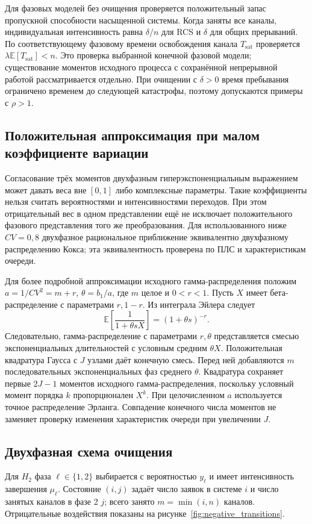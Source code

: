 Для фазовых моделей без очищения проверяется положительный запас пропускной способности насыщенной системы. Когда заняты все каналы, индивидуальная интенсивность равна \(\delta/n\) для RCS и \(\delta\) для общих прерываний. По соответствующему фазовому времени освобождения канала \(T_{\mathrm{sat}}\) проверяется \(\lambda\mathbb E[T_{\mathrm{sat}}]<n\). Это проверка выбранной конечной фазовой модели; существование моментов исходного процесса с сохранённой непрерывной работой рассматривается отдельно. При очищении с \(\delta>0\) время пребывания ограничено временем до следующей катастрофы, поэтому допускаются примеры с \(\rho>1\).

\subsection{Положительная аппроксимация при малом коэффициенте вариации}
Согласование трёх моментов двухфазным гиперэкспоненциальным выражением может давать веса вне \([0,1]\) либо комплексные параметры. Такие коэффициенты нельзя считать вероятностями и интенсивностями переходов. При этом отрицательный вес в одном представлении ещё не исключает положительного фазового представления того же преобразования. Для использованного ниже \(CV=0{,}8\) двухфазное рациональное приближение эквивалентно двухфазному распределению Кокса; эта эквивалентность проверена по ПЛС и характеристикам очереди.

Для более подробной аппроксимации исходного гамма-распределения положим \(a=1/CV^2=m+r\), \(\theta=b_1/a\), где \(m\) целое и \(0<r<1\). Пусть \(X\) имеет бета-распределение с параметрами \(r,1-r\). Из интеграла Эйлера \cite{nistdlmf} следует
\[
\mathbb E\!\left[\frac{1}{1+\theta sX}\right]=(1+\theta s)^{-r}.
\]
Следовательно, гамма-распределение с параметрами \(r,\theta\) представляется смесью экспоненциальных длительностей с условным средним \(\theta X\). Положительная квадратура Гаусса с \(J\) узлами даёт конечную смесь. Перед ней добавляются \(m\) последовательных экспоненциальных фаз среднего \(\theta\). Квадратура сохраняет первые \(2J-1\) моментов исходного гамма-распределения, поскольку условный момент порядка \(k\) пропорционален \(X^k\). При целочисленном \(a\) используется точное распределение Эрланга. Совпадение конечного числа моментов не заменяет проверку изменения характеристик очереди при увеличении \(J\).

\subsection{Двухфазная схема очищения}\label{sec:clearing}
Для \(H_2\) фаза \(\ell\in\{1,2\}\) выбирается с вероятностью \(y_\ell\) и имеет интенсивность завершения \(\mu_\ell\). Состояние \((i,j)\) задаёт число заявок в системе \(i\) и число занятых каналов в фазе 2 \(j\); всего занято \(m=\min(i,n)\) каналов. Отрицательные воздействия показаны на рисунке~\ref{fig:negative_transitions}.

